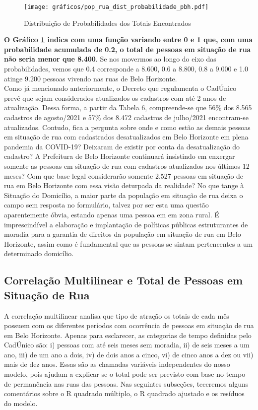 \documentclass[12pt]{article}
\begin{document}
\begin{figure}[H]
\centering
	\caption{Distribuição de Probabilidades dos Totais Encontrados}
	\texttt{[image: gráficos/pop\_rua\_dist\_probabilidade\_pbh.pdf]}
	\label{fig:pop_rua_dist_prob}
\end{figure}

\textbf{O Gráfico \ref{fig:pop_rua_dist_prob} indica com uma função variando entre 0 e 1 que, com uma probabilidade acumulada de 0.2, o total de pessoas em situação de rua não seria menor que 8.400}. Se nos movermos ao longo do eixo das probabilidades, vemos que 0.4 corresponde a 8.600, 0.6 a 8.800, 0.8 a 9.000 e 1.0 atinge 9.200 pessoas vivendo nas ruas de Belo Horizonte.\\

Como já mencionado anteriormente, o Decreto que regulamenta o CadÚnico prevê que sejam considerados atualizados os cadastros com até 2 anos de atualização. Dessa forma, a partir da Tabela 6, compreende-se que 56\% dos 8.565 cadastros de agosto/2021 e 57\% dos 8.472 cadastros de julho/2021 encontram-se atualizados. Contudo, fica a pergunta sobre onde e como estão as demais pessoas em situação de rua com cadastrados desatualizados em Belo Horizonte em plena pandemia da COVID-19? Deixaram de existir por conta da desatualização do cadastro? A Prefeitura de Belo Horizonte continuará insistindo em enxergar somente as pessoas em situação de rua com cadastros atualizados nos últimos 12 meses? Com que base legal considerarão somente 2.527 pessoas em situação de rua em Belo Horizonte com essa visão deturpada da realidade? No que tange à Situação do Domicílio, a maior parte da população em situação de rua deixa o campo sem resposta no formulário, talvez por ser esta uma questão aparentemente óbvia, estando apenas uma pessoa em em zona rural. É imprescindível a elaboração e implantação de políticas públicas estruturantes de moradia para a garantia de direitos da população em situação de rua em Belo Horizonte, assim como é fundamental que as pessoas se sintam pertencentes a um determinado domicílio.

\subsection{Correlação Multilinear e Total de Pessoas em Situação de Rua}
\label{correlacao_multilinear}


A correlação multilinear analisa que tipo de atração os totais de cada mês possuem com os diferentes períodos com ocorrência de pessoas em situação de rua em Belo Horizonte. Apenas para esclarecer, as categorias de tempo definidas pelo CadÚnico são: i) pessoas com até seis meses sem moradia, ii) de seis meses a um ano, iii) de um ano a dois, iv) de dois anos a cinco, vi) de cinco anos a dez ou vii) mais de dez anos. Essas são as chamadas variáveis independentes do nosso modelo, pois ajudam a explicar se o total pode ser previsto com base no tempo de permanência nas ruas das pessoas. Nas seguintes subseções, teceremos alguns comentários sobre o R quadrado múltiplo, o R quadrado ajustado e os resíduos do modelo.
\end{document}
